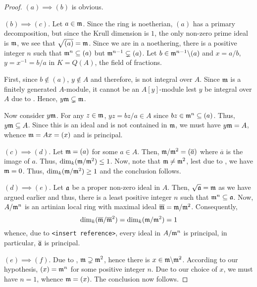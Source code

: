 \begin{proof}
    $(a)\implies(b)$ is obvious. 

    $(b)\implies(c)$. Let $a\in\mathfrak m$. Since the ring is noetherian, $(a)$ has a primary decomposition, but since the Krull dimension is $1$, the only non-zero prime ideal is $\mathfrak m$, we see that $\sqrt{(a)} = \mathfrak m$. Since we are in a noethering, there is a positive integer $n$ such that $\mathfrak m^n\subseteq (a)$ but $\mathfrak m^{n - 1}\subsetneq(a)$. Let $b\in\mathfrak m^{n - 1}\backslash(a)$ and $x = a/b$, $y = x^{-1} = b/a$ in $K = Q(A)$, the field of fractions. 

    First, since $b\notin(a)$, $y\notin A$ and therefore, is not integral over $A$. Since $\mathfrak m$ is a finitely generated $A$-module, it cannot be an $A[y]$-module lest $y$ be integral over $A$ due to . Hence, $y\mathfrak m\subsetneq\mathfrak m$.

    Now consider $y\mathfrak m$. For any $z\in\mathfrak m$, $yz = bz/a\in A$ since $bz\in\mathfrak m^n\subseteq(a)$. Thus, $y\mathfrak m\subseteq A$. Since this is an ideal and is not contained in $\mathfrak m$, we must have $y\mathfrak m = A$, whence $\mathfrak m = Ax = (x)$ and is principal. 

    $(c)\implies(d)$. Let $\mathfrak m = (a)$ for some $a\in A$. Then, $\mathfrak m/\mathfrak m^2 = (\overline a)$ where $\overline a$ is the image of $a$. Thus, $\dim_k(\mathfrak m/\mathfrak m^2)\le 1$. Now, note that $\mathfrak m\ne\mathfrak m^2$, lest due to , we have $\mathfrak m = 0$. Thus, $\dim_k(\mathfrak m/\mathfrak m^2)\ge 1$ and the conclusion follows.

    $(d)\implies(e)$. Let $\mathfrak a$ be a proper non-zero ideal in $A$. Then, $\sqrt{\mathfrak a} = \mathfrak m$ as we have argued earlier and thus, there is a least positive integer $n$ such that $\mathfrak m^n\subseteq\mathfrak a$. Now, $A/\mathfrak m^n$ is an artinian local ring with maximal ideal $\overline{\mathfrak m} = \mathfrak m/\mathfrak m^2$. Consequently, 
    \begin{equation*}
        \dim_k(\overline{\mathfrak m}/\overline{\mathfrak m}^2) = \dim_k(\mathfrak m/\mathfrak m^2) = 1
    \end{equation*}
    whence, due to \texttt{<insert reference>}, every ideal in $A/\mathfrak m^n$ is principal, in particular, $\overline{\mathfrak a}$ is principal. 

    $(e)\implies(f)$. Due to , $\mathfrak m\supsetneq\mathfrak m^2$, hence there is $x\in\mathfrak m\backslash\mathfrak m^2$. According to our hypothesis, $(x) = \mathfrak m^n$ for some positive integer $n$. Due to our choice of $x$, we must have $n = 1$, whence $\mathfrak m = (x)$. The conclusion now follows. 


\end{proof}
